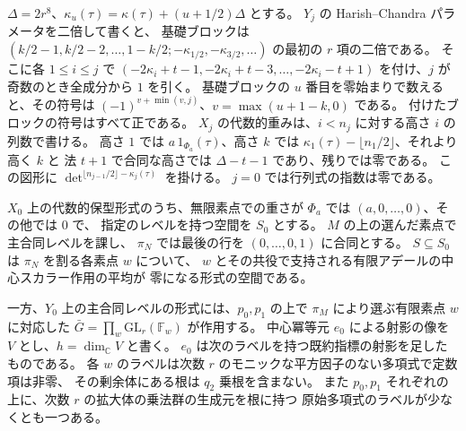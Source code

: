 \(\Delta=2r^8\)、\(\kappa_u(\tau)=\kappa(\tau)+(u+1/2)\Delta\) とする。
\(Y_j\) の Harish--Chandra パラメータを二倍して書くと、
基礎ブロックは \((k/2-1,k/2-2,\ldots,1-k/2;
-\kappa_{1/2},-\kappa_{3/2},\ldots)\) の最初の \(r\) 項の二倍である。
そこに各 \(1\le i\le j\) で
\((-2\kappa_i+t-1,-2\kappa_i+t-3,\ldots,-2\kappa_i-t+1)\)
を付け、\(j\) が奇数のとき全成分から \(1\) を引く。
基礎ブロックの \(u\) 番目を零始まりで数えると、その符号は
\((-1)^{v+\min(v,j)}\)、\(v=\max(u+1-k,0)\) である。
付けたブロックの符号はすべて正である。
\(X_j\) の代数的重みは、\(i<n_j\) に対する高さ \(i\) の列数で書ける。
高さ \(1\) では \(a\,1_{\Phi_a}(\tau)\)、高さ \(k\) では
\(\kappa_1(\tau)-\lfloor n_1/2\rfloor\)、それより高く \(k\) と
法 \(t+1\) で合同な高さでは \(\Delta-t-1\) であり、残りでは零である。
この図形に \(\det^{\lfloor n_{j-1}/2\rfloor-\kappa_j(\tau)}\) を掛ける。
\(j=0\) では行列式の指数は零である。

\(X_0\) 上の代数的保型形式のうち、無限素点での重さが
\(\Phi_a\) では \((a,0,\ldots,0)\)、その他では \(0\) で、
指定のレベルを持つ空間を \(S_0\) とする。
\(M\) の上の選んだ素点で主合同レベルを課し、
\(\pi_N\) では最後の行を \((0,\ldots,0,1)\) に合同とする。
\(S\subseteq S_0\) は \(\pi_N\) を割る各素点 \(w\) について、
\(w\) とその共役で支持される有限アデールの中心スカラー作用の平均が
零になる形式の空間である。

一方、\(Y_0\) 上の主合同レベルの形式には、\(p_0,p_1\) の上で
\(\pi_M\) により選ぶ有限素点 \(w\) に対応した
\(\bar G=\prod_w\mathrm{GL}_r(\mathbb F_w)\) が作用する。
中心冪等元 \(e_0\) による射影の像を \(V\) とし、\(h=\dim_{\mathbb C}V\) と書く。
\(e_0\) は次のラベルを持つ既約指標の射影を足したものである。
各 \(w\) のラベルは次数 \(r\) のモニックな平方因子のない多項式で定数項は非零、
その剰余体にある根は \(q_2\) 乗根を含まない。
また \(p_0,p_1\) それぞれの上に、次数 \(r\) の拡大体の乗法群の生成元を根に持つ
原始多項式のラベルが少なくとも一つある。

